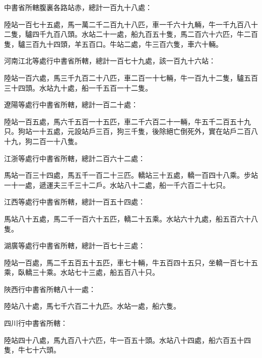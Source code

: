 \begin{pinyinscope}
 中書省所轄腹裏各路站赤，總計一百九十八處：



 陸站一百七十五處，馬一萬二千二百九十八匹，車一千六十九輛，牛一千九百八十二隻，驢四千九百八頭。水站二十一處，船九百五十隻，馬二百六十六匹，牛二百隻，驢三百九十四頭，羊五百口。牛站二處，牛三百六隻，車六十輛。



 河南江北等處行中書省所轄，總計一百七十九處，該一百九十六站：



 陸站一百六處，馬三千九百二十八匹，車二百一十七輛，牛一百九十二隻，驢五百三十四頭。水站九十處，船一千五百一十二隻。



 遼陽等處行中書省所轄，總計一百二十處：



 陸站一百五處，馬六千五百一十五匹，車二千六百二十一輛，牛五千二百五十九只。狗站一十五處，元設站戶三百，狗三千隻，後除絕亡倒死外，實在站戶二百八十九，狗二百一十八隻。



 江浙等處行中書省所轄，總計二百六十二處：



 馬站一百三十四處，馬五千一百二十三匹。轎站三十五處，轎一百四十八乘。步站一十一處，遞運夫三千三十二戶。水站八十二處，船一千六百二十七只。



 江西等處行中書省所轄，總計一百五十四處：



 馬站八十五處，馬二千一百六十五匹，轎二十五乘。水站六十九處，船五百六十八隻。



 湖廣等處行中書省所轄，總計一百七十三處：



 陸站一百處，馬二千五百五十五匹，車七十輛，牛五百四十五只，坐轎一百七十五乘，臥轎三十乘。水站七十三處，船五百八十只。



 陜西行中書省所轄八十一處：



 陸站八十處，馬七千六百二十九匹。水站一處，船六隻。



 四川行中書省所轄：



 陸站四十八處，馬九百八十六匹，牛一百五十頭。水站八十四處，船六百五十四隻，牛七十六頭。




\end{pinyinscope}
